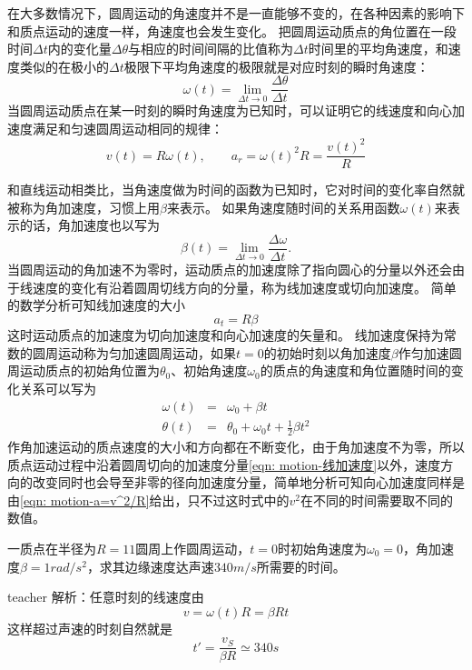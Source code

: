 在大多数情况下，圆周运动的角速度并不是一直能够不变的，在各种因素的影响下和质点运动的速度一样，角速度也会发生变化。
把圆周运动质点的角位置在一段时间$\Delta t$内的变化量$\Delta\theta$与相应的时间间隔的比值称为$\Delta t$时间里的平均角速度，和速度类似的在极小的$\Delta t$极限下平均角速度的极限就是对应时刻的瞬时角速度：
\begin{equation}
\omega(t) = \lim_{\Delta t\rightarrow 0 }\frac{\Delta \theta}{\Delta t}
\end{equation}
当圆周运动质点在某一时刻的瞬时角速度为已知时，可以证明它的线速度和向心加速度满足和匀速圆周运动相同的规律：
\begin{equation}
v(t) = R\omega(t),\qquad a_r=\omega(t)^2R = \frac{v(t)^2}{R}
\end{equation}


和直线运动相类比，当角速度做为时间的函数为已知时，它对时间的变化率自然就被称为{\heiti 角加速度}，习惯上用$\beta$来表示。
如果角速度随时间的关系用函数$\omega(t)$来表示的话，角加速度也以写为
\begin{equation}
\beta(t) = \lim_{\Delta t\rightarrow 0}\frac{\Delta \omega}{\Delta t}.
\end{equation}
当圆周运动的角加速不为零时，运动质点的加速度除了指向圆心的分量以外还会由于线速度的变化有沿着圆周切线方向的分量，称为{\heiti 线加速度}或{\heiti 切向加速度}。
简单的数学分析可知线加速度的大小
\begin{equation}\label{eqn: motion-线加速度}
a_t = R\beta
\end{equation}
这时运动质点的加速度为切向加速度和向心加速度的矢量和。
线加速度保持为常数的圆周运动称为{\heiti 匀加速圆周运动}，如果$t=0$的初始时刻以角加速度$\beta$作匀加速圆周运动质点的初始角位置为$\theta_0$、初始角速度$\omega_0$的质点的角速度和角位置随时间的变化关系可以写为
\begin{eqnarray}
\omega(t)&=&\omega_0+\beta t\\
\theta(t)&=&\theta_0+\omega_0t+\frac{1}{2}\beta t^2
\end{eqnarray}
作角加速运动的质点速度的大小和方向都在不断变化，由于角加速度不为零，所以质点运动过程中沿着圆周切向的加速度分量\ref{eqn: motion-线加速度}以外，速度方向的改变同时也会导至非零的径向加速度分量，简单地分析可知向心加速度同样是由\ref{eqn: motion-a=v^2/R}给出，只不过这时式中的$v^2$在不同的时间需要取不同的数值。



\begin{example}
一质点在半径为$R=1\unit{1}$圆周上作圆周运动，$t=0$时初始角速度为$\omega_0=0$，角加速度$\beta = 1\unit{rad/s^2}$，求其边缘速度达声速$340\unit{m/s}$所需要的时间。
\begin{taggedblock}{teacher}
\newline
解析：任意时刻的线速度由
\[v = \omega(t)R = \beta R t\]
这样超过声速的时刻自然就是
\[
t' = \frac{v_S}{\beta R}\simeq 340\unit{s}
\]
\end{taggedblock}
\end{example}


